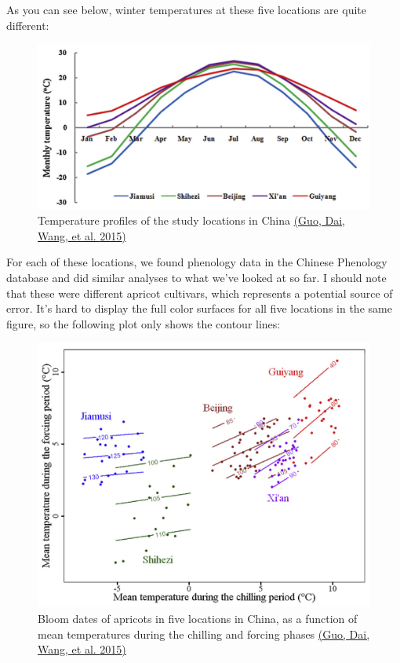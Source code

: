 \documentclass[
]{book}
\begin{document}
As you can see below, winter temperatures at these five locations are quite different:

\begin{figure}
\centering
\includegraphics{pictures/temperatures_China.jpg}
\caption{Temperature profiles of the study locations in China \href{https://doi.org/10.1016/j.agrformet.2014.10.016}{(Guo, Dai, Wang, et al. \protect\hyperlink{ref-guo2015responses}{2015})}}
\end{figure}

For each of these locations, we found phenology data in the Chinese Phenology database and did similar analyses to what we've looked at so far. I should note that these were different apricot cultivars, which represents a potential source of error. It's hard to display the full color surfaces for all five locations in the same figure, so the following plot only shows the contour lines:

\begin{figure}
\centering
\includegraphics{pictures/contours_China.jpg}
\caption{Bloom dates of apricots in five locations in China, as a function of mean temperatures during the chilling and forcing phases \href{https://doi.org/10.1016/j.agrformet.2014.10.016}{(Guo, Dai, Wang, et al. \protect\hyperlink{ref-guo2015responses}{2015})}}
\end{figure}
\end{document}

